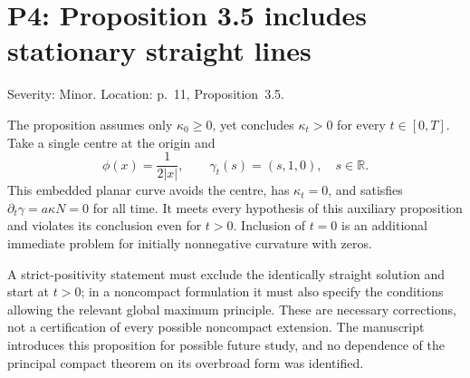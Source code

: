 \documentclass[10pt]{article}
\begin{document}
\section*{P4: Proposition 3.5 includes stationary straight lines}
Severity: Minor. Location: p. 11, Proposition 3.5.\par
The proposition assumes only \(\kappa_0\geq0\), yet concludes \(\kappa_t>0\) for every \(t\in[0,T]\). Take a single centre at the origin and \[\phi(x)=\frac1{2|x|},\qquad \gamma_t(s)=(s,1,0),\quad s\in\mathbb R.\] This embedded planar curve avoids the centre, has \(\kappa_t=0\), and satisfies \(\partial_t\gamma=a\kappa N=0\) for all time. It meets every hypothesis of this auxiliary proposition and violates its conclusion even for \(t>0\). Inclusion of \(t=0\) is an additional immediate problem for initially nonnegative curvature with zeros.\par
A strict-positivity statement must exclude the identically straight solution and start at \(t>0\); in a noncompact formulation it must also specify the conditions allowing the relevant global maximum principle. These are necessary corrections, not a certification of every possible noncompact extension. The manuscript introduces this proposition for possible future study, and no dependence of the principal compact theorem on its overbroad form was identified.\par
\end{document}
